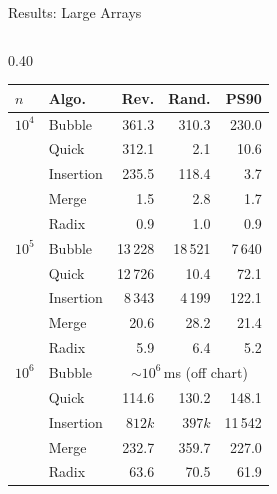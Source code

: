 \documentclass[aspectratio=169]{beamer}
\begin{document}
\begin{frame}{Results: Large Arrays}
  \begin{columns}[T]
    \begin{column}{0.40\textwidth}
      \centering
      \tiny\setlength{\tabcolsep}{2.5pt}
      \begin{tabular}{llrrr}
        \toprule
        $n$ & \textbf{Algo.} & \textbf{Rev.} & \textbf{Rand.} & \textbf{PS90} \\
        \midrule
        $10^4$  & Bubble    &  361.3 &  310.3 & 230.0 \\
                & Quick     &  312.1 &    2.1 &  10.6 \\
                & Insertion &  235.5 &  118.4 &   3.7 \\
                & Merge     &    1.5 &    2.8 &   1.7 \\
                & Radix     &    0.9 &    1.0 &   0.9 \\
        \midrule
        $10^5$  & Bubble    & 13\,228 & 18\,521 & 7\,640 \\
                & Quick     & 12\,726 &   10.4 &  72.1 \\
                & Insertion &  8\,343 & 4\,199 & 122.1 \\
                & Merge     &   20.6 &   28.2 &  21.4 \\
                & Radix     &    5.9 &    6.4 &   5.2 \\
        \midrule
        $10^6$  & Bubble    & \multicolumn{3}{c}{${\sim}10^6$\,ms (off chart)} \\
                & Quick     &  114.6 &  130.2 & 148.1 \\
                & Insertion & $812k$ & $397k$ & 11\,542 \\
                & Merge     &  232.7 &  359.7 & 227.0 \\
                & Radix     &   63.6 &   70.5 &  61.9 \\
        \bottomrule
      \end{tabular}
      \vspace{0.15em}
      

\end{column}
\end{columns}
\end{frame}
\end{document}
